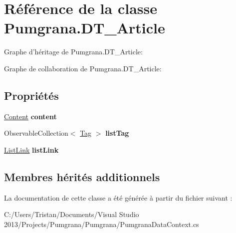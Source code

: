 \hypertarget{class_pumgrana_1_1_d_t___article}{\section{Référence de la classe Pumgrana.\+D\+T\+\_\+\+Article}
\label{class_pumgrana_1_1_d_t___article}
}


Graphe d'héritage de Pumgrana.\+D\+T\+\_\+\+Article\+:


Graphe de collaboration de Pumgrana.\+D\+T\+\_\+\+Article\+:
\subsection*{Propriétés}
\begin{DoxyCompactItemize}
\item 
\hypertarget{class_pumgrana_1_1_d_t___article_a0195f2c5a87154f8f536a5ef5b24cd95}{\hyperlink{class_pumgrana_1_1_content}{Content} {\bfseries content}}\label{class_pumgrana_1_1_d_t___article_a0195f2c5a87154f8f536a5ef5b24cd95}

\item 
\hypertarget{class_pumgrana_1_1_d_t___article_aa83bdee6164dc82d58b7b6e7d1086c2d}{Observable\+Collection$<$ \hyperlink{class_pumgrana_1_1_tag}{Tag} $>$ {\bfseries list\+Tag}}\label{class_pumgrana_1_1_d_t___article_aa83bdee6164dc82d58b7b6e7d1086c2d}

\item 
\hypertarget{class_pumgrana_1_1_d_t___article_acc16d86d7837a44a31880bedb4c6d5dc}{\hyperlink{class_pumgrana_1_1_list_link}{List\+Link} {\bfseries list\+Link}}\label{class_pumgrana_1_1_d_t___article_acc16d86d7837a44a31880bedb4c6d5dc}

\end{DoxyCompactItemize}
\subsection*{Membres hérités additionnels}


La documentation de cette classe a été générée à partir du fichier suivant \+:\begin{DoxyCompactItemize}
\item 
C\+:/\+Users/\+Tristan/\+Documents/\+Visual Studio 2013/\+Projects/\+Pumgrana/\+Pumgrana/Pumgrana\+Data\+Context.\+cs\end{DoxyCompactItemize}
